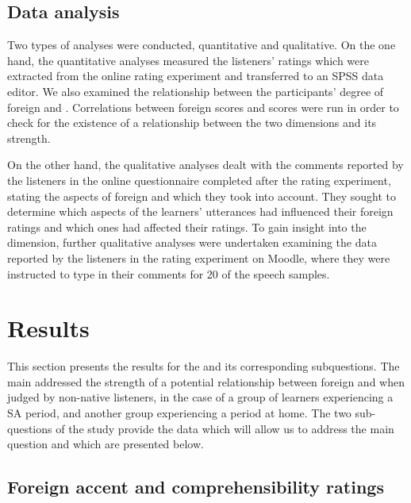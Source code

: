 \documentclass[output=paper]{langsci/langscibook}
\begin{document}
\subsection{Data analysis}


Two types of analyses were conducted, quantitative and qualitative. On the one hand, the quantitative analyses measured the listeners’ ratings which were extracted from the online rating experiment and transferred to an SPSS data editor. We also examined the relationship between the participants’ degree of foreign  and . Correlations between foreign  scores and  scores were run in order to check for the existence of a relationship between the two dimensions and its strength. 

On the other hand, the qualitative analyses dealt with the comments reported by the listeners in the online questionnaire completed after the rating experiment, stating the aspects of foreign  and  which they took into account. They sought to determine which aspects of the learners’ utterances had influenced their foreign  ratings and which ones had affected their  ratings. To gain insight into the  dimension, further qualitative analyses were undertaken examining the data reported by the listeners in the rating experiment on Moodle, where they were instructed to type in their comments for 20 of the speech samples.


\section{Results}

This section presents the results for the  and its corresponding subquestions. The main  addressed the strength of a potential relationship between foreign  and  when judged by non-native listeners, in the case of a group of  learners experiencing a SA period, and another group experiencing a  period at home. The two sub-questions of the study provide the data which will allow us to address the main question and which are presented below. 


\subsection{Foreign accent and comprehensibility ratings}
\end{document}

